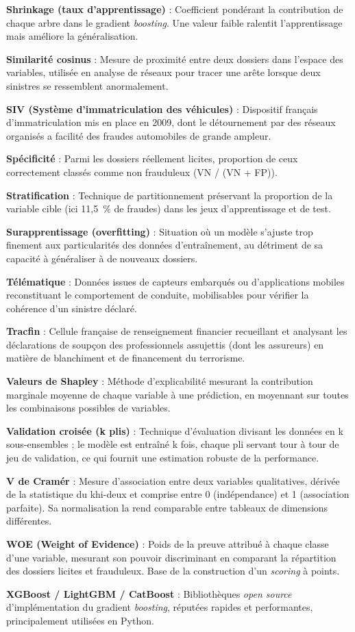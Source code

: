 \textbf{Shrinkage (taux d'apprentissage)} : Coefficient pondérant la contribution de chaque arbre dans le gradient \textit{boosting}. Une valeur faible ralentit l'apprentissage mais améliore la généralisation.

\textbf{Similarité cosinus} : Mesure de proximité entre deux dossiers dans l'espace des variables, utilisée en analyse de réseaux pour tracer une arête lorsque deux sinistres se ressemblent anormalement.

\textbf{SIV (Système d'immatriculation des véhicules)} : Dispositif français d'immatriculation mis en place en 2009, dont le détournement par des réseaux organisés a facilité des fraudes automobiles de grande ampleur.

\textbf{Spécificité} : Parmi les dossiers réellement licites, proportion de ceux correctement classés comme non frauduleux (VN / (VN + FP)).

\textbf{Stratification} : Technique de partitionnement préservant la proportion de la variable cible (ici 11,5~\% de fraudes) dans les jeux d'apprentissage et de test.

\textbf{Surapprentissage (overfitting)} : Situation où un modèle s'ajuste trop finement aux particularités des données d'entraînement, au détriment de sa capacité à généraliser à de nouveaux dossiers.

\textbf{Télématique} : Données issues de capteurs embarqués ou d'applications mobiles reconstituant le comportement de conduite, mobilisables pour vérifier la cohérence d'un sinistre déclaré.

\textbf{Tracfin} : Cellule française de renseignement financier recueillant et analysant les déclarations de soupçon des professionnels assujettis (dont les assureurs) en matière de blanchiment et de financement du terrorisme.

\textbf{Valeurs de Shapley} : Méthode d'explicabilité mesurant la contribution marginale moyenne de chaque variable à une prédiction, en moyennant sur toutes les combinaisons possibles de variables.

\textbf{Validation croisée (k plis)} : Technique d'évaluation divisant les données en k sous-ensembles ; le modèle est entraîné k fois, chaque pli servant tour à tour de jeu de validation, ce qui fournit une estimation robuste de la performance.

\textbf{V de Cramér} : Mesure d'association entre deux variables qualitatives, dérivée de la statistique du khi-deux et comprise entre 0 (indépendance) et 1 (association parfaite). Sa normalisation la rend comparable entre tableaux de dimensions différentes.

\textbf{WOE (Weight of Evidence)} : Poids de la preuve attribué à chaque classe d'une variable, mesurant son pouvoir discriminant en comparant la répartition des dossiers licites et frauduleux. Base de la construction d'un \textit{scoring} à points.

\textbf{XGBoost / LightGBM / CatBoost} : Bibliothèques \textit{open source} d'implémentation du gradient \textit{boosting}, réputées rapides et performantes, principalement utilisées en Python.
